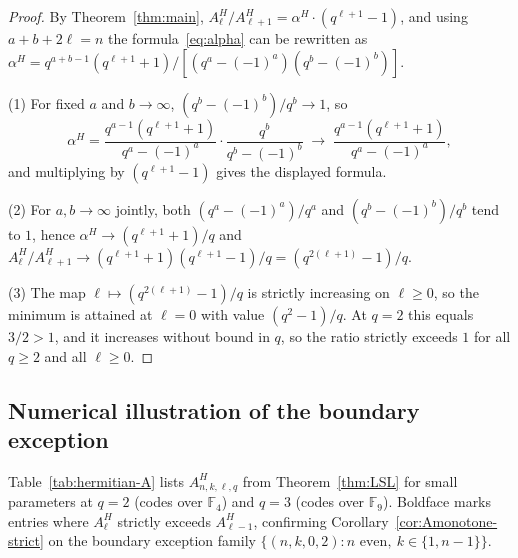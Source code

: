 \documentclass[10pt,a4paper]{amsart}
\newcommand{\F}{\mathbb{F}}
\begin{document}
\begin{proof}
By Theorem~\ref{thm:main}, $A^H_\ell/A^H_{\ell+1} = \alpha^H \cdot (q^{\ell+1}-1)$,
and using $a + b + 2\ell = n$ the formula~\eqref{eq:alpha} can be rewritten as
$\alpha^H = q^{a+b-1}(q^{\ell+1}+1)/[(q^a-(-1)^a)(q^b-(-1)^b)]$.

(1) For fixed $a$ and $b \to \infty$, $(q^b - (-1)^b)/q^b \to 1$, so
\[
  \alpha^H
  = \frac{q^{a-1}(q^{\ell+1}+1)}{q^a - (-1)^a} \cdot \frac{q^b}{q^b - (-1)^b}
  \;\longrightarrow\; \frac{q^{a-1}(q^{\ell+1}+1)}{q^a - (-1)^a},
\]
and multiplying by $(q^{\ell+1}-1)$ gives the displayed formula.

(2) For $a, b \to \infty$ jointly, both $(q^a - (-1)^a)/q^a$ and
$(q^b - (-1)^b)/q^b$ tend to $1$, hence
$\alpha^H \to (q^{\ell+1}+1)/q$ and
$A^H_\ell/A^H_{\ell+1} \to (q^{\ell+1}+1)(q^{\ell+1}-1)/q = (q^{2(\ell+1)}-1)/q$.

(3) The map $\ell \mapsto (q^{2(\ell+1)}-1)/q$ is strictly increasing on
$\ell \geq 0$, so the minimum is attained at $\ell = 0$ with value
$(q^2 - 1)/q$. At $q = 2$ this equals $3/2 > 1$, and it increases without
bound in $q$, so the ratio strictly exceeds $1$ for all $q \geq 2$ and all
$\ell \geq 0$.
\end{proof}

\subsection{Numerical illustration of the boundary exception}\label{sec:Hnum}

Table~\ref{tab:hermitian-A} lists $A^H_{n,k,\ell,q}$ from Theorem~\ref{thm:LSL}
for small parameters at $q = 2$ (codes over $\F_4$) and $q = 3$ (codes over
$\F_9$). Boldface marks entries where $A^H_\ell$ strictly exceeds $A^H_{\ell-1}$,
confirming Corollary~\ref{cor:Amonotone-strict} on the boundary exception
family $\{(n, k, 0, 2) : n \text{ even},\ k \in \{1, n-1\}\}$.
\end{document}
